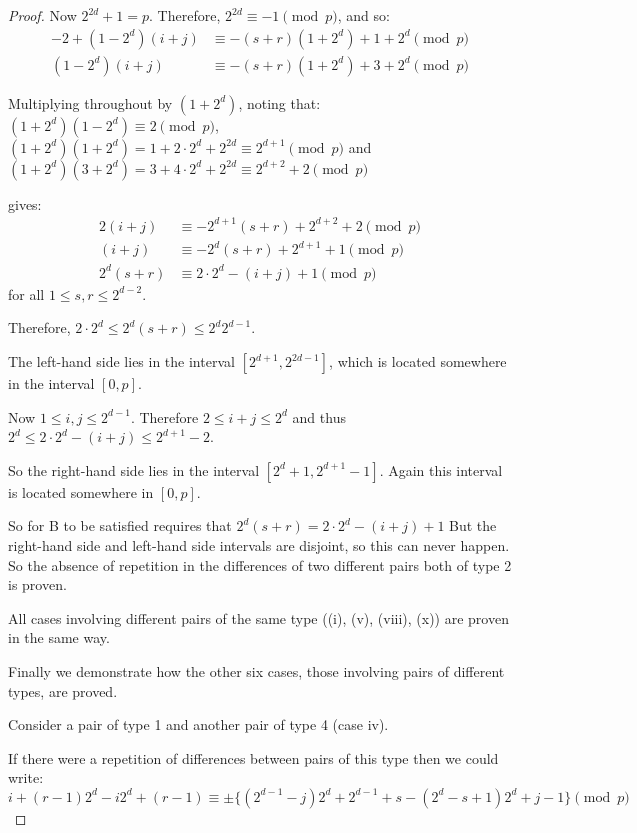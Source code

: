 \begin{proof}
Now $2^{2d} + 1 = p$.
Therefore, $2^{2d} \equiv -1\pmod p$, and so:
\begin{align*}
-2 + (1 - 2^d)(i + j) &\equiv -(s + r)(1 + 2^d) + 1 + 2^d\pmod p \\
(1 - 2^d)(i + j) &\equiv -(s + r)(1 + 2^d) + 3 + 2^d\pmod p
\end{align*}

Multiplying throughout by $(1 + 2^d)$, noting that:
$(1 + 2^d)(1 - 2^d) \equiv 2\pmod p$,
$(1 + 2^d)(1 + 2^d) = 1 + 2 \cdot 2^d + 2^{2d} \equiv 2^{d + 1}\pmod p$
and
$(1 + 2^d)(3 + 2^d) = 3 + 4 \cdot 2^d + 2^{2d} \equiv 2^{d + 2} + 2 \pmod p$

gives:
\begin{align*}
  2(i + j)   &\equiv -2^{d + 1}(s + r) + 2^{d + 2} + 2 \pmod p \\
  (i + j)    &\equiv -2^{d}(s + r) + 2^{d + 1} + 1 \pmod p \\
  2^d(s + r) &\equiv 2 \cdot 2^{d} - (i + j) + 1 \pmod p
\end{align*}
for all $1 \leq s, r \leq 2^{d-2}$.

Therefore, $2 \cdot 2^d \leq 2^d(s+r) \leq 2^d2^{d-1}$.

The left-hand side lies in the interval $[2^{d + 1}, 2^{2d - 1}]$, which is located somewhere in the interval $[0, p]$.

Now $1 \leq i, j \leq 2^{d - 1}$.
Therefore $2 \leq i + j \leq 2^d$ and thus $2^d \leq 2 \cdot 2^d -(i+j) \leq 2^{d+1} - 2$.

So the right-hand side lies in the interval $[2^d + 1, 2^{d + 1} - 1]$.
Again this interval is located somewhere in $[0, p]$.

So for B to be satisfied requires that
$2^d(s + r) = 2 \cdot 2^d - (i + j) + 1$
But the right-hand side and left-hand side intervals are disjoint, so this can never happen.
So the absence of repetition in the differences of two different pairs both of type 2 is proven.

All cases involving different pairs of the same type ((i), (v), (viii), (x)) are proven in the same way.

Finally we demonstrate how the other six cases, those involving pairs of different types, are proved.

Consider a pair of type 1 and another pair of type 4 (case iv).

If there were a repetition of differences between pairs of this type then we could write:
\begin{equation*}
  i + (r - 1)2^d - i2^d + (r - 1) \equiv \pm \{(2^{d - 1} - j)2^d + 2^{d - 1} + s - (2^d - s + 1)2^d + j - 1\}\pmod p
\end{equation*}


\end{proof}
